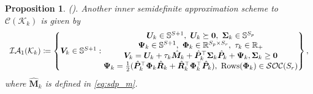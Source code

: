 \documentclass{article}
\newcommand{\RR}{\mathbb{R}}
\newtheorem{proposition}{Proposition}
\begin{document}
\begin{proposition}\textup{(\cite[Proposition 1]{MSRO-decision-rules}).}
Another inner semidefinite approximation scheme to $\mathcal{C} (\mathcal K_k)$ is given by
\begin{equation}
\label{eq:sdp2}
\begin{array}{clll}
     \mathcal{IA}_1 (\mathcal K_k) \coloneqq \left\{ \bm V_k \in \mathbb{S}^{S+1}: \begin{matrix}\bm U_k \in \mathbb{S}^{S+1}, \ \bm U_k \succeq \bm 0, \ \bm \Sigma_k \in \mathbb{S}^{S_p}\\
     \bm \Psi_k \in \mathbb{S}^{S+1}, \ \bm \Phi_k \in \RR^{S_p \times S_r}, \ \tau_k \in \RR_{+}\\
     \bm V_k = \bm U_k + \tau_k \hat{\bm M}_k + \hat{\bm P}_k^\top \bm \Sigma_k \hat{\bm P}_k + \bm \Psi_k, \bm \Sigma_k \geq \bm 0\\
     \bm \Psi_k = \frac{1}{2}(\hat{\bm P}_k^\top \bm \Phi_k \hat{\bm R}_k  + \hat{\bm R}_k^\top \bm \Phi_k^\top \hat{\bm P}_k), \ \textup{Rows}(\bm \Phi_k) \in \mathcal{SOC}(S_r)
    \end{matrix}\right\},
\end{array}
\end{equation}
where $\hat{\bm M}_k$ is defined in \eqref{eq:sdp_m}.
\end{proposition}
\end{document}
